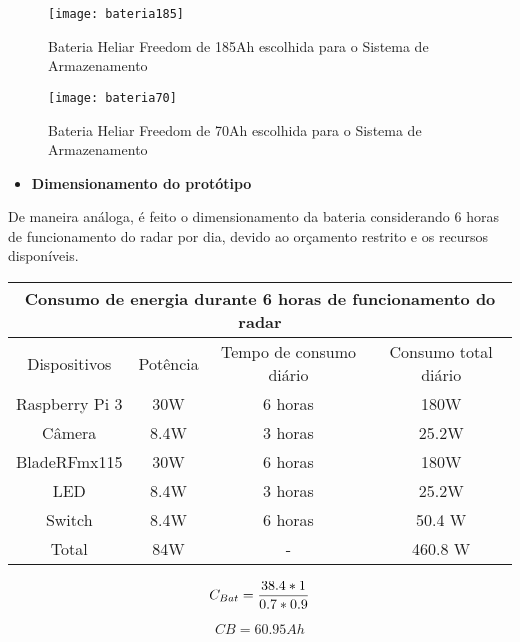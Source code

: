 \begin{figure}[h!]
\centering
\texttt{[image: bateria185]}
\caption{Bateria Heliar Freedom de 185Ah escolhida para o Sistema de Armazenamento}
\label{fig:bateria185}
\end{figure}
\pagebreak

\begin{figure}[h!]
\centering
\texttt{[image: bateria70]}
\caption{Bateria Heliar Freedom de 70Ah escolhida para o Sistema de Armazenamento}
\label{fig:bateria70}
\end{figure}

    \begin{itemize}
        \item \textbf{Dimensionamento do protótipo}
    \end{itemize}
    
    De maneira análoga, é feito o dimensionamento da bateria considerando 6 horas de funcionamento do radar por dia, devido ao orçamento restrito e os recursos disponíveis.
    
\begin{table}[H]
\begin{tabular}{|c|c|c|c|}
\hline
\multicolumn{4}{|c|}{Consumo de energia durante 6 horas de funcionamento do radar}                                                 \\ \hline
Dispositivos             & Potência         & Tempo de consumo diário & Consumo total diário \\ \hline
Raspberry Pi 3  & 30W  & 6 horas          & 180W    \\ \hline
Câmera & 8.4W  &   3 horas        & 25.2W \\ \hline
BladeRFmx115 & 30W  & 6 horas         & 180W \\ \hline
LED       & 8.4W &  3 horas & 25.2W    \\ \hline
Switch       & 8.4W &  6 horas & 50.4 W    \\ \hline
Total & 84W & - & 460.8 W \\ \hline
\end{tabular}
\end{table}
\FloatBarrier
    
\begin{equation}
    C_{Bat} = \frac{38.4*1}{0.7*0.9}\\
\end{equation}

\begin{equation}
    CB = 60.95 Ah
\end{equation}


